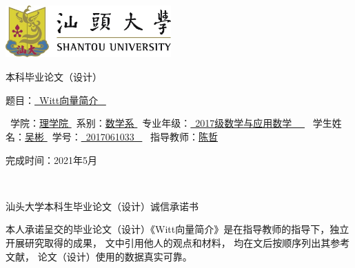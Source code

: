 \documentclass[UTF8, twoside]{ctexart}
\theoremstyle{nonumberplain}
\theoremstyle{nonumberplain}
\theoremstyle{plain}
\begin{document}
	
	
	\thispagestyle{empty}
	
	\includegraphics[height=2cm, width=6.35cm]{汕大校徽.jpg}
	
	\vskip 2cm
	
	\begin{center}
		\kaishu {} 本科毕业论文（设计）
	\end{center}
	
	\vskip 3cm
	
	\kaishu {}
	\quad 题\quad 目：\underline{\qquad \ Witt向量简介 \qquad \ }
	
	\vskip 3cm

	\kaishu {}
	\qquad \ 学\qquad 院：\underline{\qquad \qquad \qquad 理学院 \qquad \qquad \qquad }
	\vskip 0.2cm
	\qquad \ 系\qquad 别：\underline{\qquad \qquad \qquad 数学系 \qquad \qquad \qquad }
	\vskip 0.2cm
	\qquad \ 专业年级：\underline{\qquad \ 2017级数学与应用数学 \qquad \ \ }
	\vskip 0.2cm
	\qquad \ 学生姓名：\underline{\qquad \qquad \qquad 吴\quad 彬 \qquad \qquad \qquad }
	\vskip 0.2cm
	\qquad \ 学\qquad 号：\underline{\qquad \qquad \quad \ 2017061033 \qquad \qquad \quad \ }
	\vskip 0.3cm
	\qquad \ 指导教师：\underline{\qquad \qquad \qquad 陈\quad 哲 \qquad \qquad \qquad }
	
	\vskip 4cm
	
	\begin{center}
		完成时间：2021年5月
	\end{center}
	
	\newpage
	\thispagestyle{empty}
	\ 
	\newpage
	
	
	\thispagestyle{empty}
	
	\begin{center}
		 \heiti
		汕头大学本科生毕业论文（设计）诚信承诺书
	\end{center}
	
	\vskip 1cm
	
	\kaishu {}
	本人承诺呈交的毕业论文（设计）《Witt向量简介》是在指导教师的指导下，独立开展研究取得的成果，
	文中引用他人的观点和材料，
	均在文后按顺序列出其参考文献，
	论文（设计）使用的数据真实可靠。
	
\end{document}
